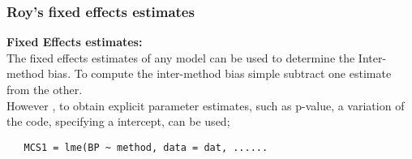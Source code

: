 \begin{frame}[fragile]\frametitle{Roy's fixed effects estimates}
\textbf{Fixed Effects estimates:}\\
The fixed effects estimates of any model can be used to determine the Inter-method bias. To compute the inter-method bias simple subtract one estimate from the other. \\However , to obtain explicit parameter estimates, such as p-value, a variation of the code, specifying a intercept, can be used;
\begin{verbatim}
   MCS1 = lme(BP ~ method, data = dat, ......
\end{verbatim}

\end{frame}

